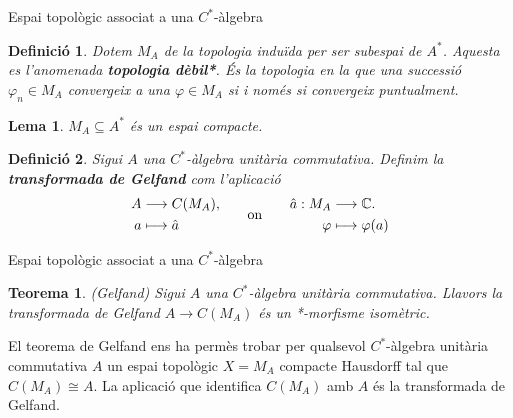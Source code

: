 \documentclass{beamer}
\newtheorem{teorema}{Teorema}
\newtheorem{lema}{Lema}
\newtheorem{definicio}{Definici\'{o}}
\theoremstyle{definition}
\begin{document}
\begin{frame}{Espai topol\`{o}gic associat a una $C^*$-\`{a}lgebra}
\begin{definicio}
Dotem $M_A$ de la topologia indu\"{i}da per ser subespai de $A^*$. Aquesta es l'anomenada \textbf{topologia d\`{e}bil*}. \'{E}s la topologia en la que una successi\'{o} $\varphi_n\in M_A$ convergeix a una $\varphi\in M_A$ si i nom\'{e}s si convergeix puntualment.
\end{definicio}
\pause

\begin{lema}
$M_A\subseteq A^*$ \'{e}s un espai compacte.
\end{lema}
\pause

\begin{definicio}
Sigui $A$ una $C^*$-\`{a}lgebra unit\`{a}ria commutativa. Definim la \textbf{transformada de Gelfand} com l'aplicaci\'{o}
\[\begin{split}A&\longrightarrow C(M_A),\\a&\longmapsto\hat{a}\end{split}\hspace{7mm}\text{on}\hspace{7mm}\begin{split}\hat{a}:M_A&\longrightarrow\mathbb{C}.\\\varphi&\longmapsto\varphi(a)\end{split}\]
\end{definicio}
\end{frame}

\begin{frame}{Espai topol\`{o}gic associat a una $C^*$-\`{a}lgebra}
\begin{teorema}
(Gelfand) Sigui $A$ una $C^*$-\`{a}lgebra unit\`{a}ria commutativa. Llavors la transformada de Gelfand $A\rightarrow C(M_A)$ \'{e}s un *-morfisme isom\`{e}tric.
\end{teorema}
\pause

El teorema de Gelfand ens ha perm\`{e}s trobar per qualsevol $C^*$-\`{a}lgebra unit\`{a}ria commutativa $A$ un espai topol\`{o}gic $X=M_A$ compacte Hausdorff tal que $C(M_A)\cong A$. La aplicaci\'{o} que identifica $C(M_A)$ amb $A$ \'{e}s la transformada de Gelfand.
\end{frame}
\end{document}
